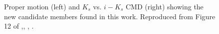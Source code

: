  \begin{figure}[ht]
\begin{center}
\caption{Proper motion (left) and $K_s$ vs. $i-K_s$ CMD (right) showing the new candidate members found in this work. Reproduced from Figure 12 of \citet{Olivares2017},\textit{}, , .}
\label{fig:newones}
\end{center}
\end{figure}


